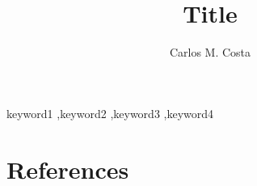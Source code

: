 










\begin{frontmatter}

\title{Title}


\author[feup-address]{Carlos M. Costa}

\address[feup-address]{Rua Dr. Roberto Frias, s/n 4200-465 Porto, Portugal}





\begin{keyword}
	keyword1 \sep keyword2 \sep keyword3 \sep keyword4
\end{keyword}

\end{frontmatter}














\section*{References}







